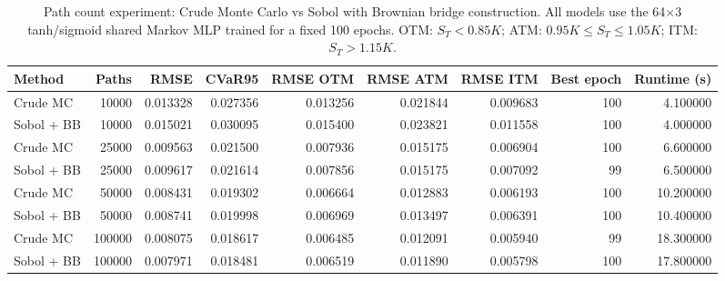 \begin{table}
\caption{Path count experiment: Crude Monte Carlo vs Sobol with Brownian bridge construction. All models use the 64$\times$3 tanh/sigmoid shared Markov MLP trained for a fixed 100 epochs. OTM: $S_T < 0.85K$; ATM: $0.95K \leq S_T \leq 1.05K$; ITM: $S_T > 1.15K$.}
\label{tab:path_count}
\begin{tabular}{lrrrrrrrr}
\toprule
Method & Paths & RMSE & CVaR95 & RMSE OTM & RMSE ATM & RMSE ITM & Best epoch & Runtime (s) \\
\midrule
Crude MC & 10000 & 0.013328 & 0.027356 & 0.013256 & 0.021844 & 0.009683 & 100 & 4.100000 \\
Sobol + BB & 10000 & 0.015021 & 0.030095 & 0.015400 & 0.023821 & 0.011558 & 100 & 4.000000 \\
Crude MC & 25000 & 0.009563 & 0.021500 & 0.007936 & 0.015175 & 0.006904 & 100 & 6.600000 \\
Sobol + BB & 25000 & 0.009617 & 0.021614 & 0.007856 & 0.015175 & 0.007092 & 99 & 6.500000 \\
Crude MC & 50000 & 0.008431 & 0.019302 & 0.006664 & 0.012883 & 0.006193 & 100 & 10.200000 \\
Sobol + BB & 50000 & 0.008741 & 0.019998 & 0.006969 & 0.013497 & 0.006391 & 100 & 10.400000 \\
Crude MC & 100000 & 0.008075 & 0.018617 & 0.006485 & 0.012091 & 0.005940 & 99 & 18.300000 \\
Sobol + BB & 100000 & 0.007971 & 0.018481 & 0.006519 & 0.011890 & 0.005798 & 100 & 17.800000 \\
\bottomrule
\end{tabular}
\end{table}
